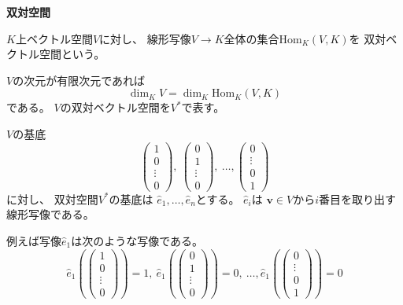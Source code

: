 \documentclass[12pt,b5paper]{ltjsarticle}
\begin{document}
\begin{enumerate}
\end{enumerate}

\hrulefill

\textbf{双対空間}

$K$上ベクトル空間$V$に対し、
線形写像$V\rightarrow K$全体の集合$\mathrm{Hom}_{K}(V,K)$を
双対ベクトル空間という。

$V$の次元が有限次元であれば
\begin{equation}
 \dim_{K}V
  =
  \dim_{K}\mathrm{Hom}_{K}(V,K)
\end{equation}
である。
$V$の双対ベクトル空間を$V^{*}$で表す。

$V$の基底
\begin{equation}
 \begin{pmatrix}1\\0\\ \vdots\\0\end{pmatrix}
 , \
   \begin{pmatrix}0\\1\\ \vdots\\0\end{pmatrix}
   , \ \dots ,
 \begin{pmatrix}0\\ \vdots\\0\\1\end{pmatrix}
\end{equation}
に対し、
双対空間$V^{*}$の基底は
$\hat{e}_1, \dots,\hat{e}_n$とする。
$\hat{e}_i$は
$\bm{v}\in V$から$i$番目を取り出す線形写像である。

例えば写像$\hat{e}_1$は次のような写像である。
\begin{equation}
 \hat{e}_1(\begin{pmatrix}1\\0\\ \vdots\\0\end{pmatrix}) = 1, \
 \hat{e}_1(\begin{pmatrix}0\\1\\ \vdots\\0\end{pmatrix}) = 0, \ \dots ,
 \hat{e}_1(\begin{pmatrix}0\\ \vdots\\0\\1\end{pmatrix}) = 0
\end{equation}
\end{document}
